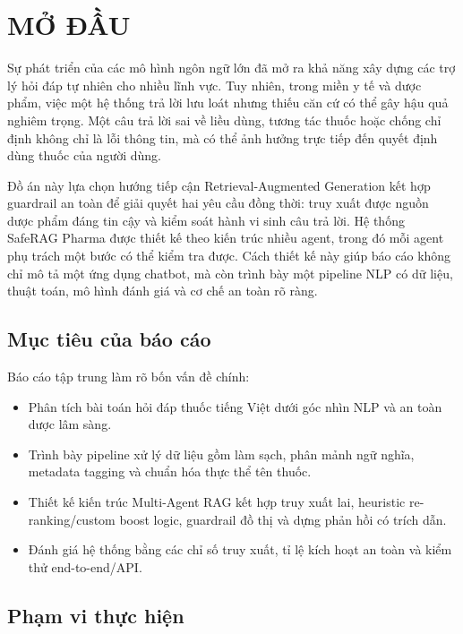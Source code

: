 \chapter*{MỞ ĐẦU}

Sự phát triển của các mô hình ngôn ngữ lớn đã mở ra khả năng xây dựng các trợ lý hỏi đáp tự nhiên cho nhiều lĩnh vực. Tuy nhiên, trong miền y tế và dược phẩm, việc một hệ thống trả lời lưu loát nhưng thiếu căn cứ có thể gây hậu quả nghiêm trọng. Một câu trả lời sai về liều dùng, tương tác thuốc hoặc chống chỉ định không chỉ là lỗi thông tin, mà có thể ảnh hưởng trực tiếp đến quyết định dùng thuốc của người dùng.

Đồ án này lựa chọn hướng tiếp cận Retrieval-Augmented Generation kết hợp guardrail an toàn để giải quyết hai yêu cầu đồng thời: truy xuất được nguồn dược phẩm đáng tin cậy và kiểm soát hành vi sinh câu trả lời. Hệ thống SafeRAG Pharma được thiết kế theo kiến trúc nhiều agent, trong đó mỗi agent phụ trách một bước có thể kiểm tra được. Cách thiết kế này giúp báo cáo không chỉ mô tả một ứng dụng chatbot, mà còn trình bày một pipeline NLP có dữ liệu, thuật toán, mô hình đánh giá và cơ chế an toàn rõ ràng.

\section*{Mục tiêu của báo cáo}

Báo cáo tập trung làm rõ bốn vấn đề chính:

\begin{itemize}
  \item Phân tích bài toán hỏi đáp thuốc tiếng Việt dưới góc nhìn NLP và an toàn dược lâm sàng.
  \item Trình bày pipeline xử lý dữ liệu gồm làm sạch, phân mảnh ngữ nghĩa, metadata tagging và chuẩn hóa thực thể tên thuốc.
  \item Thiết kế kiến trúc Multi-Agent RAG kết hợp truy xuất lai, heuristic re-ranking/custom boost logic, guardrail đồ thị và dựng phản hồi có trích dẫn.
  \item Đánh giá hệ thống bằng các chỉ số truy xuất, tỉ lệ kích hoạt an toàn và kiểm thử end-to-end/API.
\end{itemize}

\section*{Phạm vi thực hiện}

